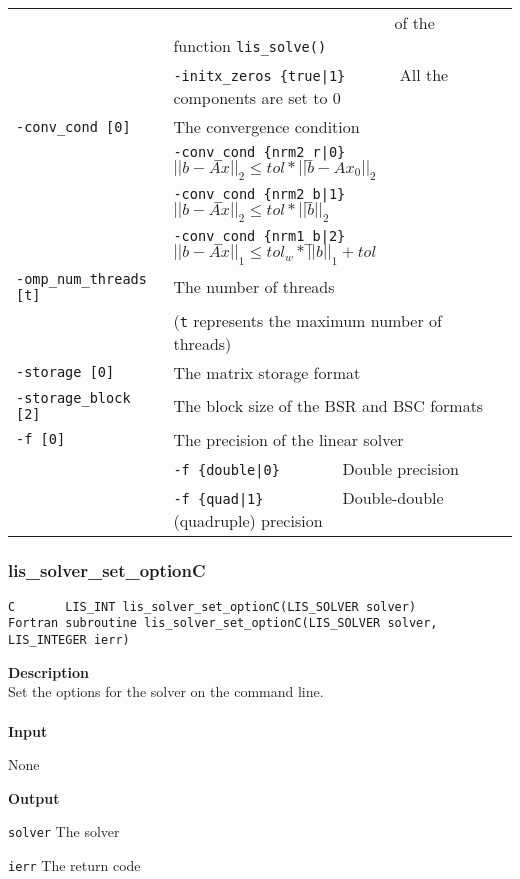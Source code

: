 \documentclass[a4paper]{article}
\newcommand{\namelistlabel}[1]{\mbox{#1}\hfill}
\newenvironment{namelist}[1]{%
\begin{list}{}
  {\let\makelabel\namelistlabel
  \settowidth{\labelwidth}{#1}
  \setlength{\leftmargin}{1.1\labelwidth}}
  }{%
\end{list}}
\begin{document}
\begin{minipage}[t]{\textwidth}
\begin{center}
\begin{tabular}{l|ll}
                       & \verb=                           =  of the function \verb=lis_solve()= \\
                       & \verb=-initx_zeros {true|1}      =  All the components are set to $0$ \\
\verb=-conv_cond [0]= & The convergence condition  \\
                       & \verb=-conv_cond {nrm2_r|0}     =  $||b-Ax||_2 \le tol * ||b-Ax_0||_2$ \\
                       & \verb=-conv_cond {nrm2_b|1}     =  $||b-Ax||_2 \le tol * ||b||_2$ \\
                       & \verb=-conv_cond {nrm1_b|2}     =  $||b-Ax||_1 \le tol_w * ||b||_1 + tol$\\
\verb=-omp_num_threads [t]= & The number of threads        \\ 
                            & (\verb=t= represents the maximum number of
 threads) \\
\verb=-storage [0]=    & The matrix storage format \\
\verb=-storage_block [2]=& The block size of the BSR and BSC formats\\ 
\verb=-f [0]=          & The precision of the linear solver\\
                       & \verb=-f {double|0}       =  Double precision \\ 
                       & \verb=-f {quad|1}         =  Double-double (quadruple) precision \\
\hline         
\end{tabular}
\end{center}
\end{minipage}

\newpage
\subsubsection{lis\_solver\_set\_optionC}
\begin{screen}
\verb|C       LIS_INT lis_solver_set_optionC(LIS_SOLVER solver)|\\
\verb|Fortran subroutine lis_solver_set_optionC(LIS_SOLVER solver, LIS_INTEGER ierr)|
\end{screen}
{\bf Description}\\
\indent
Set the options for the solver on the command line.
\\ \\
\noindent
{\bf Input}
\begin{namelist}{XXXXXXXXXXXXXXXXXXXX}
\item[None]
\end{namelist}
{\bf Output}
\begin{namelist}{XXXXXXXXXXXXXXXXXXXX}
\item[\tt solver] The solver
\item[\tt ierr] The return code
\end{namelist}
\end{document}
